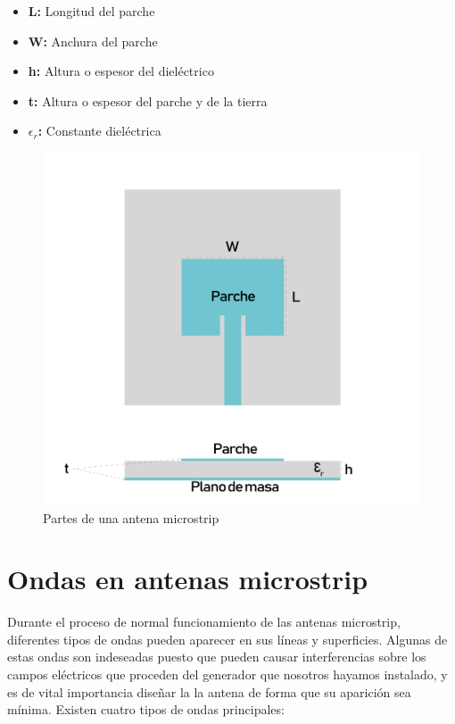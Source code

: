 \begin{itemize}
\item \textbf{L: }Longitud del parche
\item \textbf{W: }Anchura del parche
\item \textbf{h: }Altura o espesor del dieléctrico
\item \textbf{t: }Altura o espesor del parche y de la tierra
\item \textbf{$\epsilon_{r}$: }Constante dieléctrica
\end{itemize}
 
\begin{figure}[h]
    \centering
        \includegraphics[width=15cm]{archivos/parche/elemento}
        \caption{Partes de una antena microstrip}
        \label{fig:elementos}
\end{figure}

\section{Ondas en antenas microstrip}

\par Durante el proceso de normal funcionamiento de las antenas microstrip, diferentes tipos de ondas pueden aparecer en sus líneas y superficies. Algunas de estas ondas son indeseadas puesto que pueden causar interferencias sobre los campos eléctricos que proceden del generador que nosotros hayamos instalado, y es de vital importancia diseñar la la antena de forma que su aparición sea mínima. Existen cuatro tipos de ondas principales:

